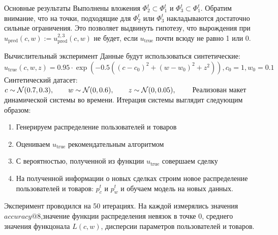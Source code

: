 \documentclass{beamer}
\begin{document}
\begin{frame}{Основные результаты}
Выполнены вложения $\Phi^t_2 \subset \Phi^t_1$ и $\Phi^t_3 \subset \Phi^t_1$. Обратим внимание, что на точки, подходящие для $\Phi^t_2$ или $\Phi^t_3$ накладываются достаточно сильные ограничения. Это позволяет выдвинуть гипотезу, что вырождения при $u_{\text{pred}}(c, w) := u^{2,3}_{\text{pred}}(c, w)$ не будет, если $u_{\text{true}}$ почти всюду не равно 1 или 0.

\end{frame}


\begin{frame}{Вычислительный эксперимент}
\small
    Данные будут использоваться синтетические:
    $$u_{\text{true}}(c, w, z) = 0.95 \cdot \exp(-0.5((c - c_0)^2 + (w - w_0)^2 +z^2)), c_0 = 1, w_0 = 0.1$$
    Синтетический датасет:
        $\\
        c \sim \mathcal{N}(0.7, 0.3), \qquad
        w \sim \mathcal{N}(0, 0.6),  \qquad
        z \sim \mathcal{N}(0, 0.05),  \qquad
        $
    Реализован макет динамической системы во времени.
    Итерация системы выглядит следующим образом:
    \begin{enumerate}
        \item Генерируем распределение пользователей и товаров
        \item Оцениваем $u_{\text{true}}$ рекомендательным алгоритмом
        \item С вероятностью, полученной из функции $u_{\text{true}}$ совершаем сделку
        \item На полученной информации о новых сделках строим новое распределение пользователей и товаров: $p_c^t$ и $p_w^t$ и обучаем модель на новых данных.
    \end{enumerate}
    \scriptsize{
    Эксперимент проводился на 50 итерациях. 
    На каждой измерялись значения $accuracy@8$,значение функции распределения невязок в точке 0, среднего значения функцонала $L(c, w)$, дисперсии параметров пользователей и товаров.
    }
\end{frame}



\end{document}
